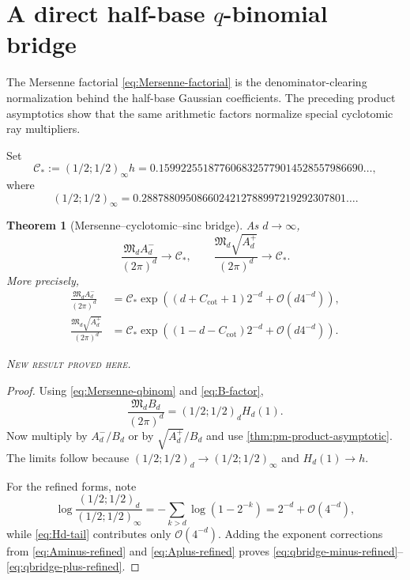 \documentclass[11pt,oneside]{article}
\newtheorem{theorem}{Theorem}[section]
\theoremstyle{definition}
\theoremstyle{remark}
\newcommand{\bigO}{\mathcal O}
\newcommand{\newresult}{\textcolor{newgreen}{\textsc{New result proved here.}}}
\begin{document}
\section{A direct half-base $q$-binomial bridge}\label{sec:qbridge}

The Mersenne factorial \eqref{eq:Mersenne-factorial} is the denominator-clearing
normalization behind the half-base Gaussian coefficients. The preceding product
asymptotics show that the same arithmetic factors normalize special cyclotomic
ray multipliers.

Set
\begin{equation}
 \mathcal C_*:=(1/2;1/2)_\infty h
 =0.1599225518776068325779014528557986690\ldots,
 \label{eq:Cstar}
\end{equation}
where
\begin{equation}
 (1/2;1/2)_\infty
 =0.2887880950866024212788997219292307801\ldots.
 \label{eq:qpoch-number}
\end{equation}

\begin{theorem}[Mersenne--cyclotomic--sinc bridge]\label{thm:qbridge}
As $d\to\infty$,
\begin{equation}
 \boxed{
 \frac{\mathfrak M_dA_d^-}{(2\pi)^d}\longrightarrow\mathcal C_*},
 \qquad
 \boxed{
 \frac{\mathfrak M_d\sqrt{A_d^+}}{(2\pi)^d}\longrightarrow\mathcal C_*}.
 \label{eq:qbridge-limits}
\end{equation}
More precisely,
\begin{align}
 \frac{\mathfrak M_dA_d^-}{(2\pi)^d}
 &=\mathcal C_*
 \exp\!\left((d+C_{\cot}+1)2^{-d}+\bigO(d4^{-d})\right),
 \label{eq:qbridge-minus-refined}\\
 \frac{\mathfrak M_d\sqrt{A_d^+}}{(2\pi)^d}
 &=\mathcal C_*
 \exp\!\left((1-d-C_{\cot})2^{-d}+\bigO(d4^{-d})\right).
 \label{eq:qbridge-plus-refined}
\end{align}

\smallskip\noindent\newresult
\end{theorem}

\begin{proof}
Using \eqref{eq:Mersenne-qbinom} and \eqref{eq:B-factor},
\[
 \frac{\mathfrak M_dB_d}{(2\pi)^d}
 =(1/2;1/2)_dH_d(1).
\]
Now multiply by $A_d^-/B_d$ or by $\sqrt{A_d^+}/B_d$ and use
\cref{thm:pm-product-asymptotic}. The limits follow because
$(1/2;1/2)_d\to(1/2;1/2)_\infty$ and $H_d(1)\to h$.

For the refined forms, note
\[
 \log\frac{(1/2;1/2)_d}{(1/2;1/2)_\infty}
 =-\sum_{k>d}\log(1-2^{-k})=2^{-d}+\bigO(4^{-d}),
\]
while \eqref{eq:Hd-tail} contributes only $\bigO(4^{-d})$. Adding the exponent
corrections from \eqref{eq:Aminus-refined} and \eqref{eq:Aplus-refined} proves
\eqref{eq:qbridge-minus-refined}--\eqref{eq:qbridge-plus-refined}.
\end{proof}
\end{document}
